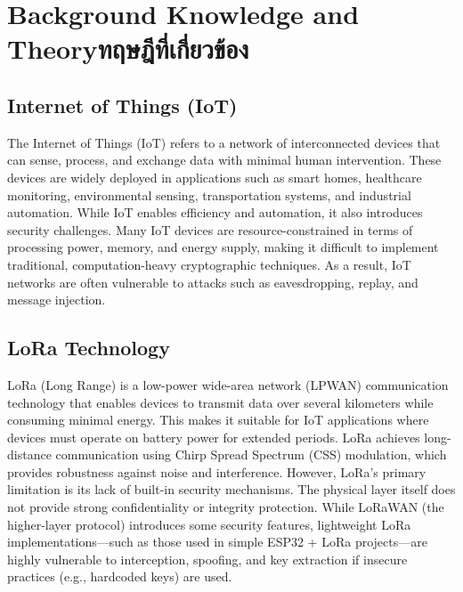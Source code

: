 \chapter{\ifenglish Background Knowledge and Theory\else ทฤษฎีที่เกี่ยวข้อง\fi}


\section{Internet of Things (IoT)}
The Internet of Things (IoT) refers to a network of interconnected devices that can sense, process, and exchange data with minimal human intervention. These devices are widely deployed in applications such as smart homes, healthcare monitoring, environmental sensing, transportation systems, and industrial automation. While IoT enables efficiency and automation, it also introduces security challenges. Many IoT devices are resource-constrained in terms of processing power, memory, and energy supply, making it difficult to implement traditional, computation-heavy cryptographic techniques. As a result, IoT networks are often vulnerable to attacks such as eavesdropping, replay, and message injection.

\section{LoRa Technology}
LoRa (Long Range) is a low-power wide-area network (LPWAN) communication technology that enables devices to transmit data over several kilometers while consuming minimal energy. This makes it suitable for IoT applications where devices must operate on battery power for extended periods. LoRa achieves long-distance communication using Chirp Spread Spectrum (CSS) modulation, which provides robustness against noise and interference.
 However, LoRa’s primary limitation is its lack of built-in security mechanisms. The physical layer itself does not provide strong confidentiality or integrity protection. While LoRaWAN (the higher-layer protocol) introduces some security features, lightweight LoRa implementations—such as those used in simple ESP32 + LoRa projects—are highly vulnerable to interception, spoofing, and key extraction if insecure practices (e.g., hardcoded keys) are used.

